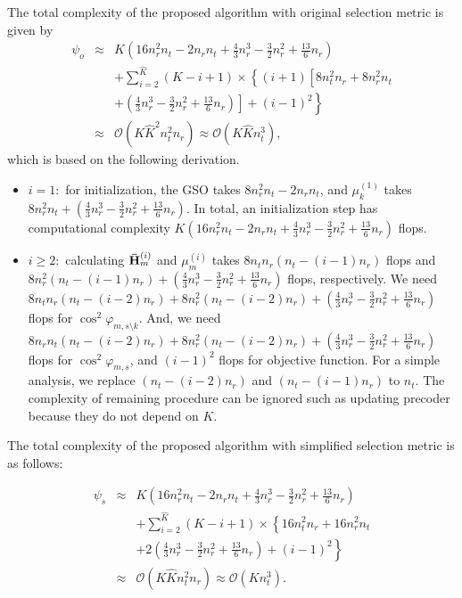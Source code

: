 \documentclass[journal,twoside]{IEEEtranTCOM}
\begin{document}
The total complexity of the proposed algorithm with original selection metric is given by
\begin{eqnarray} \label{eq:Complexity}
{\psi _{o}} & \approx &   K(16{n_r^2}n_t - 2{n_r}{n_t}+ {\frac{4}{3}n_r^3 - \frac{3}{2}n_r^2 + \frac{{13}}{6}{n_r}})  \nonumber \\
& & + \sum\limits_{i = 2}^{\hat K}  {(K - i + 1)} \times \left\{  (i + 1)\left[ {8{n_t^2}{n_r}} + 8n_r^2{n_t} \right. \right. \nonumber \\
& & + \left. \left. \left( {\frac{4}{3}n_r^3 - \frac{3}{2}n_r^2 + \frac{{13}}{6}{n_r}} \right) \right]  + (i-1)^2 \right\} \nonumber\\
& \approx & {\mathcal{O}}(K{{\hat K}^2}n_t^2{n_r}) \approx {\mathcal{O}}(K{\hat K}{n_t^3}),
\end{eqnarray}
which is based on the following derivation.
\begin{itemize}
\item{$i=1:$ for initialization, the GSO takes $8{n_r^2}{n_t}-2{n_r}{n_t}$, and $\mu_k^{(1)}$ takes $8{n_r^2}{n_t} + \left ({\frac{4}{3}n_r^3 - \frac{3}{2}n_r^2 + \frac{{13}}{6}{n_r}} \right)$. In total, an initialization step has computational complexity $K(16{n_r^2}n_t - 2{n_r}{n_t}+ {\frac{4}{3}n_r^3 - \frac{3}{2}n_r^2 + \frac{{13}}{6}{n_r}})$ flops.}
\item{$i\geq2:$ calculating ${\bf{\bar H}}_m^{(i)}$ and $\mu_m^{(i)}$ takes ${8{n_t}{n_r}\left( {{n_t} - (i - 1){n_r}} \right)}$ flops and $8n_r^2\left( {{n_t} - (i - 1){n_r}} \right) + \left( {\frac{4}{3}n_r^3 - \frac{3}{2}n_r^2 + \frac{{13}}{6}{n_r}} \right)$ flops, respectively. We need ${8{n_t}{n_r}\left( {{n_t} - (i - 2){n_r}} \right)}  + 8n_r^2( {{n_t} - (i - 2){n_r}}) +\left( {\frac{4}{3}n_r^3 - \frac{3}{2}n_r^2 + \frac{{13}}{6}{n_r}} \right)$ flops for ${\cos^2 \varphi_{{m}, s \setminus k }}$. And, we need $8{n_r}{n_t}(n_t-(i-2){n_r}) + 8n_r^2(n_t-(i-2){n_r})  +  \left( {\frac{4}{3}n_r^3 - \frac{3}{2}n_r^2 + \frac{{13}}{6}{n_r}} \right)$ flops for ${\cos^2 \varphi_{{m}, s}}$, and $(i-1)^2$ flops for objective function. For a simple analysis, we replace $({{n_t} - (i - 2){n_r}})$ and $({{n_t} - (i - 1){n_r}})$ to $n_t$. The complexity of remaining procedure can be ignored such as updating precoder because they do not depend on $K$. }
\end{itemize}

The total complexity of the proposed algorithm with simplified selection metric is as follows:

\begin{eqnarray} \label{eq:Complexity}
{\psi _{s}} & \approx &   K(16{n_r^2}n_t - 2{n_r}{n_t}+ {\frac{4}{3}n_r^3 - \frac{3}{2}n_r^2 + \frac{{13}}{6}{n_r}})  \nonumber \\
& & + \sum\limits_{i = 2}^{\hat K}  {(K - i + 1)} \times  \left\{  {16{n_t^2}{n_r}} + 16n_r^2{n_t} \right. \nonumber \\
& & + \left. 2\left( {\frac{4}{3}n_r^3 - \frac{3}{2}n_r^2 + \frac{{13}}{6}{n_r}} \right) + (i-1)^2 \right\} \nonumber \\
& \approx & {\mathcal{O}}(K{{\hat K}}n_t^2{n_r}) \approx {\mathcal{O}}(K{n_t^3}).
\end{eqnarray}
\end{document}
